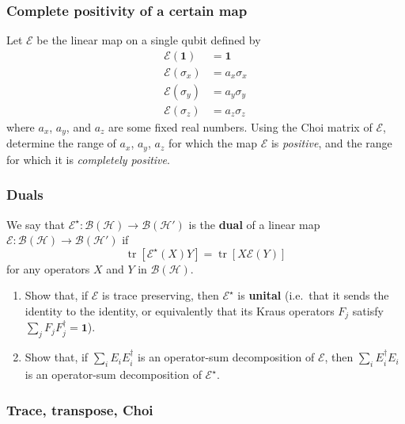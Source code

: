 \documentclass[fleqn]{article}
\providecommand{\tightlist}{%
  \setlength{\itemsep}{0pt}\setlength{\parskip}{0pt}}
\begin{document}
\hypertarget{complete-positivity-of-a-certain-map}{%
\subsubsection{Complete positivity of a certain map}\label{complete-positivity-of-a-certain-map}}

Let \(\mathcal{E}\) be the linear map on a single qubit defined by
\[
  \begin{aligned}
    \mathcal{E}(\mathbf{1})
    &= \mathbf{1}
  \\\mathcal{E}(\sigma_x)
    &= a_x\sigma_x
  \\\mathcal{E}(\sigma_y)
    &= a_y\sigma_y
  \\\mathcal{E}(\sigma_z)
    &= a_z\sigma_z
  \end{aligned}
\]
where \(a_x\), \(a_y\), and \(a_z\) are some fixed real numbers.
Using the Choi matrix of \(\mathcal{E}\), determine the range of \(a_x\), \(a_y\), \(a_z\) for which the map \(\mathcal{E}\) is \emph{positive}, and the range for which it is \emph{completely positive}.

\hypertarget{duals}{%
\subsubsection{Duals}\label{duals}}

We say that \(\mathcal{E}^\star\colon\mathcal{B}(\mathcal{H})\to\mathcal{B}(\mathcal{H}')\) is the \textbf{dual} of a linear map \(\mathcal{E}\colon\mathcal{B}(\mathcal{H})\to\mathcal{B}(\mathcal{H}')\) if
\[
  \operatorname{tr}[\mathcal{E}^\star (X)Y] = \operatorname{tr}[X\mathcal{E}(Y)]
\]
for any operators \(X\) and \(Y\) in \(\mathcal{B}(\mathcal{H})\).

\begin{enumerate}
\def\labelenumi{\arabic{enumi}.}
\tightlist
\item
  Show that, if \(\mathcal{E}\) is trace preserving, then \(\mathcal{E}^\star\) is \textbf{unital} (i.e.~that it sends the identity to the identity, or equivalently that its Kraus operators \(F_j\) satisfy \(\sum_j F_jF_j^\dagger=\mathbf{1}\)).
\item
  Show that, if \(\sum_i E_i E_i^\dagger\) is an operator-sum decomposition of \(\mathcal{E}\), then \(\sum_i E^\dagger_i E_i\) is an operator-sum decomposition of \(\mathcal{E}^\star\).
\end{enumerate}

\hypertarget{trace-transpose-choi}{%
\subsubsection{Trace, transpose, Choi}\label{trace-transpose-choi}}
\end{document}
